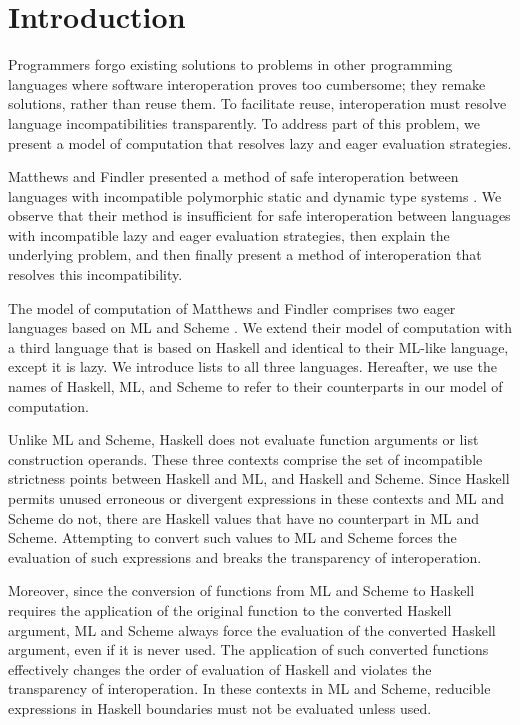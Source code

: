 \section{Introduction}

Programmers forgo existing solutions to problems in other programming languages where software interoperation proves too cumbersome; they remake solutions, rather than reuse them. To facilitate reuse, interoperation must resolve language incompatibilities transparently. To address part of this problem, we present a model of computation that resolves lazy and eager evaluation strategies.

Matthews and Findler presented a method of safe interoperation between languages with incompatible polymorphic static and dynamic type systems \cite{matthews07}. We observe that their method is insufficient for safe interoperation between languages with incompatible lazy and eager evaluation strategies, then explain the underlying problem, and then finally present a method of interoperation that resolves this incompatibility.

The model of computation of Matthews and Findler comprises two eager languages based on ML and Scheme \cite{matthews07}. We extend their model of computation with a third language that is based on Haskell and identical to their ML-like language, except it is lazy. We introduce lists to all three languages. Hereafter, we use the names of Haskell, ML, and Scheme to refer to their counterparts in our model of computation.

Unlike ML and Scheme, Haskell does not evaluate function arguments or list construction operands. These three contexts comprise the set of incompatible strictness points between Haskell and ML, and Haskell and Scheme. Since Haskell permits unused erroneous or divergent expressions in these contexts and ML and Scheme do not, there are Haskell values that have no counterpart in ML and Scheme. Attempting to convert such values to ML and Scheme forces the evaluation of such expressions and breaks the transparency of interoperation.

Moreover, since the conversion of functions from ML and Scheme to Haskell requires the application of the original function to the converted Haskell argument, ML and Scheme always force the evaluation of the converted Haskell argument, even if it is never used. The application of such converted functions effectively changes the order of evaluation of Haskell and violates the transparency of interoperation. In these contexts in ML and Scheme, reducible expressions in Haskell boundaries must not be evaluated unless used.

